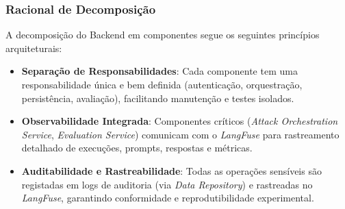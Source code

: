 \subsubsection{Racional de Decomposição}
A decomposição do Backend em componentes segue os seguintes princípios arquiteturais:
\begin{itemize}
\item \textbf{Separação de Responsabilidades}: Cada componente tem uma responsabilidade única e bem definida (autenticação, orquestração, persistência, avaliação), facilitando manutenção e testes isolados.
\item \textbf{Observabilidade Integrada}: Componentes críticos (\textit{Attack Orchestration Service}, \textit{Evaluation Service}) comunicam com o \textit{LangFuse} para rastreamento detalhado de execuções, prompts, respostas e métricas.
\item \textbf{Auditabilidade e Rastreabilidade}: Todas as operações sensíveis são registadas em logs de auditoria (via \textit{Data Repository}) e rastreadas no \textit{LangFuse}, garantindo conformidade e reprodutibilidade experimental.
\end{itemize}